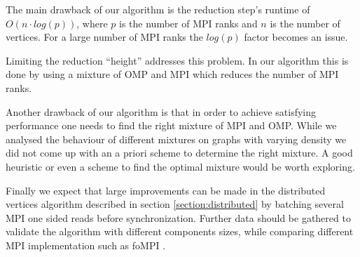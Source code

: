 The main drawback of our algorithm is the reduction step's runtime of $O\left(n \cdot
log\left(p\right)\right)$, where $p$ is the number of MPI ranks and $n$ is the number of vertices.
For a large number of MPI ranks the $log\left(p\right)$ factor becomes an issue.

Limiting the reduction ``height'' addresses this problem. In our algorithm this is done by using a
mixture of OMP and MPI which reduces the number of MPI ranks.



Another drawback of our algorithm is that in order to achieve satisfying performance one needs to
find the right mixture of MPI and OMP. While we analysed the behaviour of different mixtures on
graphs with varying density we did not come up with an a priori scheme to determine the right
mixture. A good heuristic or even a scheme to find the optimal mixture would be worth exploring.

Finally we expect that large improvements can be made in the distributed vertices algorithm
described in section \ref{section:distributed} by batching several MPI one sided reads
before synchronization. Further data should be gathered to validate the algorithm
with different components sizes, while comparing different MPI implementation such as
foMPI \cite{fompi-mpi3-one-sided}.
